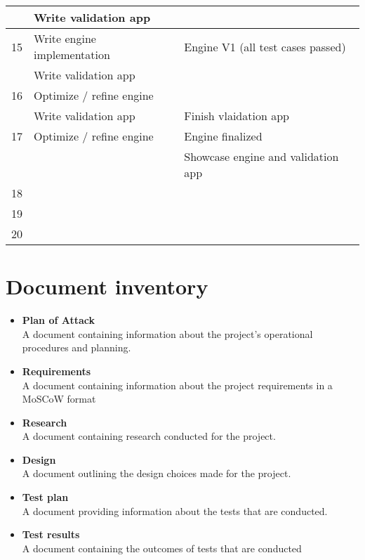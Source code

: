 \documentclass{article} %
\begin{document}
\begin{longtable}{|l|p{}|p{}|}
                         & Write validation app                      &                                         \\ \hline
    15                   & Write engine implementation               & Engine V1 (all test cases passed)       \\ \hline
                         & Write validation app                      &                                         \\ \hline
    16                   & Optimize / refine engine                  &                                         \\ \hline
                         & Write validation app                      & Finish vlaidation app                   \\ \hline
    17                   & Optimize / refine engine                  & Engine finalized                        \\ \hline
                         &                                           & Showcase engine and validation app      \\ \hline
    18                   &                                           &                                         \\ \hline
    19                   &                                           &                                         \\ \hline
    20                   &                                           &                                         \\ \hline
\end{longtable}
\newpage

\section{Document inventory}
\begin{itemize}
    \item \textbf{Plan of Attack}
          \\
          A document containing information about the project's operational procedures and planning.
    \item \textbf{Requirements}
          \\
          A document containing information about the project requirements in a MoSCoW format
    \item \textbf{Research}
          \\
          A document containing research conducted for the project.
    \item \textbf {Design}
          \\
          A document outlining the design choices made for the project.
    \item \textbf {Test plan}
          \\
          A document providing information about the tests that are conducted.
    \item \textbf {Test results}
          \\
          A document containing the outcomes of tests that are conducted
\end{itemize}
\end{document}
